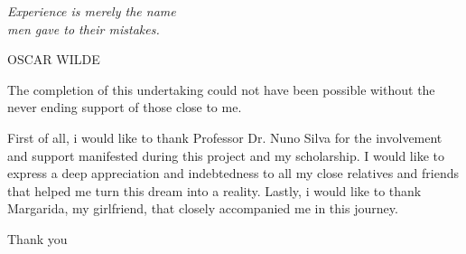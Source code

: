 

\frontmatter %

\pagestyle{plain} %


\maketitlepage

\clearpage

\thispagestyle{empty}
\null\vfill

\settowidth{}
\centering
\parbox{\longest}{%
  \raggedright{\huge\itshape%
   Experience is merely the name \\ 
   men gave to their mistakes.\par\bigskip
  }   
  \raggedleft\Large\MakeUppercase{Oscar Wilde}\par%
}

\vfill\vfill

\clearpage
\raggedright
%
\begin{dedicatory}
The completion of this undertaking could not have been possible without the never ending support of those close to me. 

First of all, i would like to thank Professor Dr. Nuno Silva for the involvement and support manifested during this project and my scholarship. 
I would like to express a deep appreciation and indebtedness to all my close relatives and friends that helped me turn this dream into a reality.
Lastly, i would like to thank Margarida, my girlfriend, that closely accompanied me in this journey.

Thank you
\end{dedicatory}


